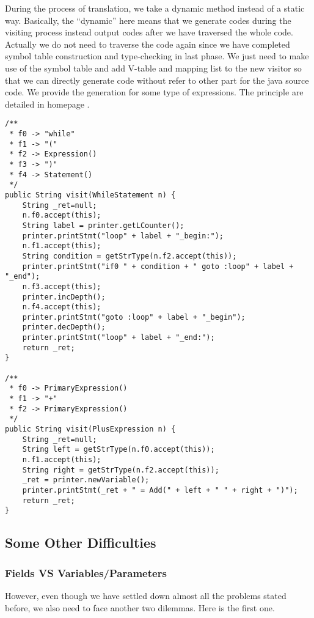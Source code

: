 \documentclass[letterpaper, 14pt]{article}
\begin{document}
During the process of translation, we take a dynamic method instead of a static way. Basically, the ``dynamic'' here means that we generate codes during the visiting process instead output codes after we have traversed the whole code. Actually we do not need to traverse the code again since we have completed symbol table construction and type-checking in last phase. We just need to make use of the symbol table and add V-table and mapping list to the new visitor so that we can directly generate code without refer to other part for the java source code. We provide the generation for some type of expressions. The principle are detailed in homepage \cite{homepage}. 
\begin{lstlisting}
/**
 * f0 -> "while"
 * f1 -> "("
 * f2 -> Expression()
 * f3 -> ")"
 * f4 -> Statement()
 */
public String visit(WhileStatement n) {
	String _ret=null;
	n.f0.accept(this);
	String label = printer.getLCounter();
	printer.printStmt("loop" + label + "_begin:");
	n.f1.accept(this);
	String condition = getStrType(n.f2.accept(this));
	printer.printStmt("if0 " + condition + " goto :loop" + label + "_end");
	n.f3.accept(this);
	printer.incDepth();
	n.f4.accept(this);
	printer.printStmt("goto :loop" + label + "_begin");
	printer.decDepth();
	printer.printStmt("loop" + label + "_end:");
	return _ret;
}

/**
 * f0 -> PrimaryExpression()
 * f1 -> "+"
 * f2 -> PrimaryExpression()
 */
public String visit(PlusExpression n) {
	String _ret=null;
	String left = getStrType(n.f0.accept(this));
	n.f1.accept(this);
	String right = getStrType(n.f2.accept(this));
	_ret = printer.newVariable();
	printer.printStmt(_ret + " = Add(" + left + " " + right + ")");
	return _ret;
}
\end{lstlisting}

\subsection{Some Other Difficulties}

\subsubsection{Fields VS Variables/Parameters}

However, even though we have settled down almost all the problems stated before, we also need to face another two dilemmas. Here is the first one. 
\end{document}
